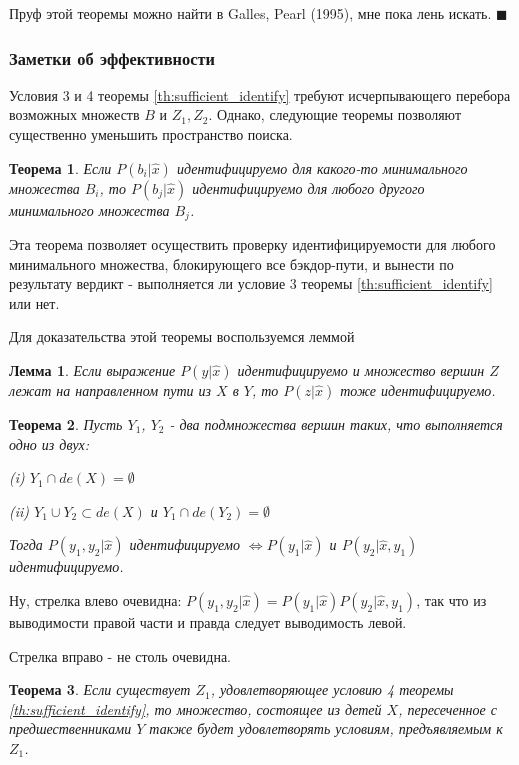 \documentclass[fleqn]{article}
\newtheorem{theorem}{Теорема}
\newtheorem{lemma}{Лемма}
\numberwithin{equation}{section}
\numberwithin{theorem}{section}
\numberwithin{figure}{section}
\numberwithin{lemma}{section}
\begin{document}
Пруф этой теоремы можно найти в Galles, Pearl (1995), мне пока лень искать.
$\blacksquare$

\subsubsection*{Заметки об эффективности}

Условия 3 и 4 теоремы \ref{th:sufficient_identify} требуют исчерпывающего перебора возможных множеств $B$ и $Z_1, Z_2$. Однако, следующие теоремы позволяют существенно уменьшить пространство поиска.

\begin{theorem}
	Если $P(b_i|\hat x)$ идентифицируемо для какого-то минимального множества $B_i$, то $P(b_j|\hat x)$ идентифицируемо для любого другого минимального множества $B_j$.
\end{theorem}

Эта теорема позволяет осуществить проверку идентифицируемости для любого минимального множества, блокирующего все бэкдор-пути, и вынести по результату вердикт - выполняется ли условие 3 теоремы \ref{th:sufficient_identify} или нет.

Для доказательства этой теоремы воспользуемся леммой

\begin{lemma}
	Если выражение $P(y|\hat x)$ идентифицируемо и множество вершин $Z$ лежат на направленном пути из $X$ в $Y$, то $P(z|\hat x)$ тоже идентифицируемо.
\end{lemma}

\begin{theorem}
	Пусть $Y_1$, $Y_2$ - два подмножества вершин таких, что выполняется одно из двух:
	
	(i) $Y_1 \cap de(X) = \emptyset$
	
	(ii) $Y_1 \cup Y_2 \subset de(X)$ и $Y_1 \cap de(Y_2) = \emptyset$

Тогда $P(y_1, y_2 | \hat x)$ идентифицируемо $\iff P(y_1|\hat x)$ и $P(y_2|\hat x, y_1)$ идентифицируемо.
\end{theorem}

Ну, стрелка влево очевидна: $P(y_1, y_2 | \hat x) = P(y_1|\hat x)P(y_2|\hat x, y_1)$, так что из выводимости правой части и правда следует выводимость левой. 

Стрелка вправо - не столь очевидна.

\begin{theorem}
	Если существует $Z_1$, удовлетворяющее условию 4 теоремы \ref{th:sufficient_identify}, то множество, состоящее из детей $X$, пересеченное с предшественниками $Y$ также будет удовлетворять условиям, предъявляемым к $Z_1$. 
\end{theorem}
\end{document}

